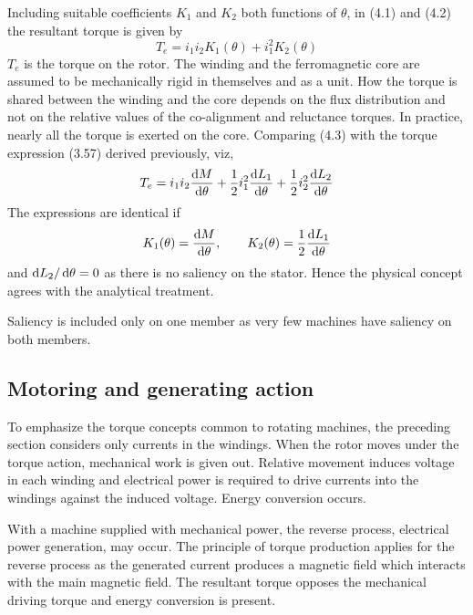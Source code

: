 \documentclass[a4paper,numbers=noenddot,12pt]{scrbook}
\begin{document}
Including suitable coefficients $K_1$ and $K_2$ both functions of $\theta$, in (4.1) and (4.2) the resultant torque is given by
\begin{equation}
    T_e = i_1 i_2 K_1(\theta) + i_1^2 K_2 (\theta)
    \label{eq:Eq4.3}
\end{equation}
$T_e$ is the torque on the rotor. The winding and the ferromagnetic core are assumed to be mechanically rigid in themselves and as a unit. How the torque is shared between the winding and the core depends on the flux distribution and not on the relative values of the co-alignment and reluctance torques. In practice, nearly all the torque is exerted on the core. 
Comparing (4.3) with the torque expression (3.57) derived previously, viz,
\begin{equation*}
    T_e = i_1 i_2 \dfrac{\dif M}{\dif \theta} + \dfrac{1}{2} i_1^2 \dfrac{\dif L_1}{\dif \theta} + \dfrac{1}{2} i_2^2 \dfrac{\dif L_2}{\dif \theta}
\end{equation*}
The expressions are identical if 
\begin{equation*}
    K_1 (\theta) = \dfrac{\dif M}{\dif \theta}, \qquad K_2(\theta) = \dfrac{1}{2} \dfrac{\dif L_1}{\dif \theta}
\end{equation*}
and $\dif L_2 / \dif \theta = 0$ as there is no saliency on the stator. Hence the physical concept agrees with the analytical treatment.

Saliency is included only on one member as very few machines have saliency on both members.

\subsection{Motoring and generating action}
To emphasize the torque concepts common to rotating machines, the preceding section considers only currents in the windings. When the rotor moves under the torque action, mechanical work is given out. Relative movement induces voltage in each winding and electrical power is required to drive currents into the windings against the induced voltage. Energy conversion occurs.

With a machine supplied with mechanical power, the reverse process, electrical power generation, may occur. The principle of torque production applies for the reverse process as the generated current produces a magnetic field which interacts with the main magnetic field. The resultant torque opposes the mechanical driving torque and energy conversion is present.
\end{document}
